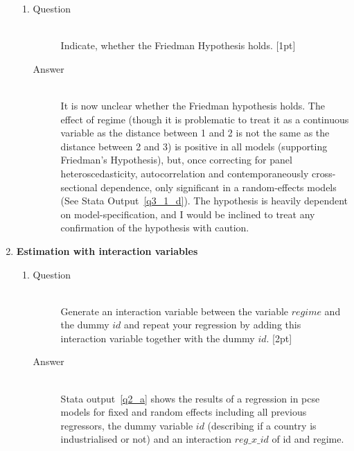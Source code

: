 \documentclass{article}
\begin{document}
\begin{enumerate}
\begin{enumerate}[label=(\alph*)]
    
    \item 
    \begin{description}
      \item[Question] \hfill \\
      Indicate, whether the Friedman Hypothesis holds. [1pt]
      \item[Answer] \hfill \\
      It is now unclear whether the Friedman hypothesis holds. The effect of regime (though it is problematic to treat it as a continuous variable as the distance between 1 and 2 is not the same as the distance between 2 and 3) is positive in all models (supporting Friedman's Hypothesis), but, once correcting for panel heteroscedasticity, autocorrelation and contemporaneously cross-sectional dependence, only significant in a random-effects models (See Stata Output~\ref{q3_1_d}). The hypothesis is heavily dependent on model-specification, and I would be inclined to treat any confirmation of the hypothesis with caution.
    \end{description}
  \end{enumerate}
  \item \textbf{Estimation with interaction variables}
  \begin{enumerate}[label=(\alph*)]
    \item 
    \begin{description}
      \item[Question] \hfill \\
      Generate an interaction variable between the variable \(regime\) and the dummy \(id\) and repeat your regression by adding this interaction variable together with the dummy \(id\). [2pt]
      \item[Answer] \hfill \\
      Stata output~\ref{q2_a} shows the results of a regression in pcse models for fixed and random effects including all previous regressors,  the dummy variable \(id\) (describing if a country is industrialised or not) and an interaction \(reg\_x\_id\) of id and regime.
      \begin{figure}
      
      \end{figure}
    \end{description}
    

\end{enumerate}
\end{enumerate}
\end{document}
